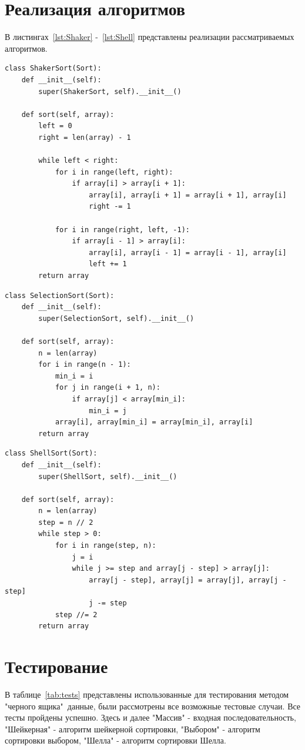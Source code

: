 \documentclass[12pt]{report}
\begin{document}
    \section{Реализация алгоритмов}
    В листингах~\ref{lst:Shaker} -~\ref{lst:Shell} представлены реализации рассматриваемых алгоритмов.
    \newpage
    \captionsetup{singlelinecheck=false, justification=raggedright}
    \begin{lstlisting}[caption=Шейкерная сортировка, label={lst:Shaker}]
class ShakerSort(Sort):
	def __init__(self):
		super(ShakerSort, self).__init__()
	
	def sort(self, array):
		left = 0
		right = len(array) - 1
		
		while left < right:
			for i in range(left, right):
				if array[i] > array[i + 1]:
					array[i], array[i + 1] = array[i + 1], array[i]
					right -= 1
			
			for i in range(right, left, -1):
				if array[i - 1] > array[i]:
					array[i], array[i - 1] = array[i - 1], array[i]
					left += 1
		return array
    \end{lstlisting}

    \begin{lstlisting}[caption=Сортировка выбором, label={lst:Select}]
class SelectionSort(Sort):
	def __init__(self):
		super(SelectionSort, self).__init__()
	
	def sort(self, array):
		n = len(array)
		for i in range(n - 1):
			min_i = i
			for j in range(i + 1, n):
				if array[j] < array[min_i]:
					min_i = j
			array[i], array[min_i] = array[min_i], array[i]
		return array
    \end{lstlisting}
    \newpage
    \begin{lstlisting}[caption=Сортировка Шелла, label={lst:Shell}]
class ShellSort(Sort):
	def __init__(self):
		super(ShellSort, self).__init__()
		
	def sort(self, array):
		n = len(array)
		step = n // 2
		while step > 0:
			for i in range(step, n):
				j = i
				while j >= step and array[j - step] > array[j]:
					array[j - step], array[j] = array[j], array[j - step]
					j -= step
			step //= 2
		return array
    \end{lstlisting}


    \section{Тестирование}
    В таблице~\ref{tab:tests} представлены использованные для тестирования методом "черного ящика"\ данные,
    были рассмотрены все возможные тестовые случаи. Все тесты пройдены успешно.
    Здесь и далее
    "Массив" - входная последовательность,
    "Шейкерная" - алгоритм шейкерной сортировки,
    "Выбором" - алгоритм сортировки выбором,
    "Шелла" - алгоритм сортировки Шелла.
\end{document}
